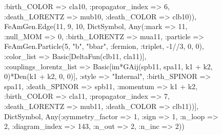 \documentclass{revtex4}
\begin{document}
\begin{figure}[!htb]
\begin{center}
{:birth_COLOR => cla10, :propagator_index => 6, :death_LORENTZ => mub10, :death_COLOR => clb10)), FeAmGen.Edge(11, 9, 10, Dict{Symbol, Any}(:mark => 11, :null_MOM => 0, :birth_LORENTZ => mua11, :particle => FeAmGen.Particle(5, "b", "bbar", :fermion, :triplet, -1//3, 0, 0), :color_list => Basic[DeltaFun(clb11, cla11)], :couplings_lorentz_list => Basic[im*GAij(spb11, spa11, k1 + k2, 0)*Den(k1 + k2, 0, 0)], :style => "Internal", :birth_SPINOR => spa11, :death_SPINOR => spb11, :momentum => k1 + k2, :birth_COLOR => cla11, :propagator_index => 7, :death_LORENTZ => mub11, :death_COLOR => clb11))], Dict{Symbol, Any}(:symmetry_factor => 1, :sign => 1, :n_loop => 2, :diagram_index => 143, :n_out => 2, :n_inc => 2)) 
}
\end{center}
\end{figure}
\end{document}
